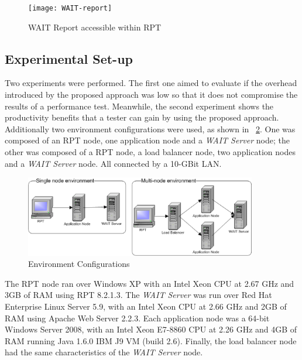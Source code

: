 \documentclass[runningheads,a4paper]{llncs}
\begin{document}

\begin{figure}[!h]
\centering
\texttt{[image: WAIT-report]}
\caption{WAIT Report accessible within RPT}
\label{fig_report}
\end{figure}

\vspace{-7pt}
\subsection{Experimental Set-up}
\vspace{-7pt}
Two experiments were performed. The first one aimed to evaluate if the overhead
introduced by the proposed approach was low so that it does not compromise the
results of a performance test. Meanwhile, the second experiment shows the
productivity benefits that a tester can gain by using the proposed approach.
Additionally two environment configurations were used, as shown in \figurename
~\ref{fig_env}. One was composed of an RPT node, one application node and a
\emph{WAIT Server} node; the other was composed of a RPT node, a load balancer node, 
two application nodes and a \emph{WAIT Server} node. All connected by a 10-GBit
LAN.

\vspace{-1pt}
\begin{figure}[!h]
\centering
\includegraphics[totalheight=.14\textheight,width=0.9\textwidth]{Environments}
\caption{Environment Configurations}
\label{fig_env}
\end{figure}

The RPT node ran over Windows XP with an Intel Xeon CPU at
2.67 GHz and 3GB of RAM using RPT 8.2.1.3. The \emph{WAIT Server} was run over
Red Hat Enterprise Linux Server 5.9, with an Intel Xeon CPU at 2.66 GHz and 2GB of
RAM using Apache Web Server 2.2.3. Each application node was a 64-bit Windows
Server 2008, with an Intel Xeon E7-8860 CPU at 2.26 GHz and 4GB of RAM
running Java 1.6.0 IBM J9 VM (build 2.6). Finally, the load balancer node had
the same characteristics of the \emph{WAIT Server} node. 
\end{document}
